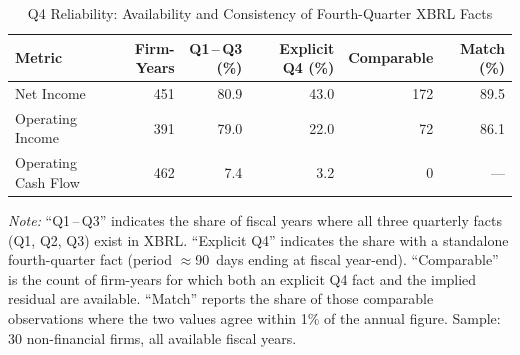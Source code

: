\begin{table}[htbp]
\centering
\caption{Q4 Reliability: Availability and Consistency of Fourth-Quarter XBRL Facts}
\label{tab:q4_reliability}
\small
\setlength{\tabcolsep}{5pt}
\begin{tabular}{lrrrrr}
\toprule
Metric & Firm-Years & Q1\,--\,Q3 (\%) & Explicit Q4 (\%) & Comparable & Match (\%) \\
\midrule
Net Income & 451 & 80.9 & 43.0 & 172 & 89.5 \\
Operating Income & 391 & 79.0 & 22.0 & 72 & 86.1 \\
Operating Cash Flow & 462 & 7.4 & 3.2 & 0 & --- \\
\bottomrule
\end{tabular}
\begin{tablenotes}
\small
\item \textit{Note:} ``Q1\,--\,Q3'' indicates the share of fiscal years where all three
quarterly facts (Q1, Q2, Q3) exist in XBRL. ``Explicit Q4'' indicates the share with
a standalone fourth-quarter fact (period $\approx$90~days ending at fiscal year-end).
``Comparable'' is the count of firm-years for which both an explicit Q4 fact and the
implied residual are available. ``Match'' reports the share of those comparable
observations where the two values agree within 1\% of the annual figure.
Sample: 30 non-financial firms, all available fiscal years.
\end{tablenotes}
\end{table}
